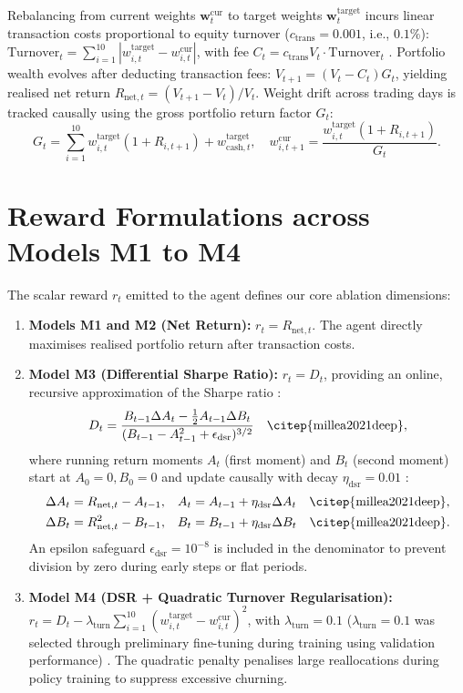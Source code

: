 Rebalancing from current weights $\mathbf{w}_t^{\text{cur}}$ to target weights $\mathbf{w}_t^{\text{target}}$ incurs linear transaction costs proportional to equity turnover ($c_{\text{trans}} = 0.001$, i.e., $0.1\%$): $\text{Turnover}_t = \sum_{i=1}^{10} |w_{i,t}^{\text{target}} - w_{i,t}^{\text{cur}}|$, with fee $C_t = c_{\text{trans}} V_t \cdot \text{Turnover}_t$ \citep{zou2024novel}. Portfolio wealth evolves after deducting transaction fees: $V_{t+1} = (V_t - C_t) G_t$, yielding realised net return $R_{\text{net},t} = (V_{t+1} - V_t) / V_t$. Weight drift across trading days is tracked causally using the gross portfolio return factor $G_t$:
\begin{equation}
G_t = \sum_{i=1}^{10} w_{i,t}^{\text{target}}(1 + R_{i,t+1}) + w_{\text{cash},t}^{\text{target}}, \quad w_{i,t+1}^{\text{cur}} = \frac{w_{i,t}^{\text{target}}(1 + R_{i,t+1})}{G_t}.
\end{equation}

\section{Reward Formulations across Models M1 to M4}
\label{sec:rewards}
The scalar reward $r_t$ emitted to the agent defines our core ablation dimensions:
\begin{enumerate}
    \item \textbf{Models M1 and M2 (Net Return):} $r_t = R_{\text{net},t}$. The agent directly maximises realised portfolio return after transaction costs.
    \item \textbf{Model M3 (Differential Sharpe Ratio):} $r_t = D_t$, providing an online, recursive approximation of the Sharpe ratio \citep{millea2021deep}:
    \begin{equation}
    D_t = \frac{B_{t-1} \Delta A_t - \frac{1}{2} A_{t-1} \Delta B_t}{(B_{t-1} - A_{t-1}^2 + \epsilon_{\text{dsr}})^{3/2}} \quad \text{\citep{millea2021deep}},
    \end{equation}
    where running return moments $A_t$ (first moment) and $B_t$ (second moment) start at $A_0 = 0, B_0 = 0$ and update causally with decay $\eta_{\text{dsr}} = 0.01$ \citep{millea2021deep}:
    \begin{align}
    \Delta A_t &= R_{\text{net},t} - A_{t-1}, & A_t &= A_{t-1} + \eta_{\text{dsr}} \Delta A_t \quad \text{\citep{millea2021deep}}, \\
    \Delta B_t &= R_{\text{net},t}^2 - B_{t-1}, & B_t &= B_{t-1} + \eta_{\text{dsr}} \Delta B_t \quad \text{\citep{millea2021deep}}.
    \end{align}
    An epsilon safeguard $\epsilon_{\text{dsr}} = 10^{-8}$ is included in the denominator to prevent division by zero during early steps or flat periods.
    \item \textbf{Model M4 (DSR + Quadratic Turnover Regularisation):} $r_t = D_t - \lambda_{\text{turn}} \sum_{i=1}^{10} (w_{i,t}^{\text{target}} - w_{i,t}^{\text{cur}})^2$, with $\lambda_{\text{turn}} = 0.1$ ($\lambda_{\text{turn}} = 0.1$ was selected through preliminary fine-tuning during training using validation performance) \citep{wang2025risk}. The quadratic penalty penalises large reallocations during policy training to suppress excessive churning.
\end{enumerate}

